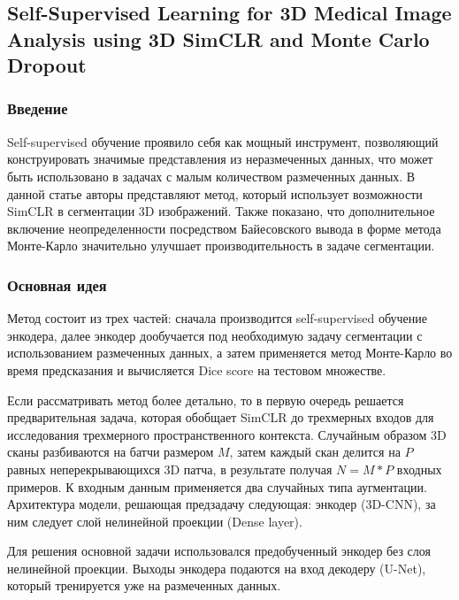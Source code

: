 \subsection*{Self-Supervised Learning for 3D Medical Image Analysis using
3D SimCLR and Monte Carlo Dropout}

\subsubsection*{Введение} 
Self-supervised обучение проявило себя как мощный инструмент,
позволяющий конструировать значимые представления из неразмеченных
данных, что может быть использовано в задачах с малым количеством 
размеченных данных. В данной статье \cite{ann14} авторы представляют метод, 
который использует возможности SimCLR в сегментации 3D изображений.
Также показано, что дополнительное включение неопределенности 
посредством Байесовского вывода в форме метода Монте-Карло
значительно улучшает производительность в задаче сегментации.

\subsubsection*{Основная идея}
Метод состоит из трех частей: сначала производится self-supervised 
обучение энкодера, далее энкодер дообучается под необходимую 
задачу сегментации с использованием размеченных данных, а затем 
применяется метод Монте-Карло во время предсказания и вычисляется 
Dice score на тестовом множестве. \par
Если рассматривать метод более детально, то в первую очередь 
решается предварительная задача, которая обобщает SimCLR до 
трехмерных входов для исследования трехмерного пространственного контекста.
Случайным образом 3D сканы разбиваются на батчи размером \(M\), затем каждый скан 
делится на \(P\) равных неперекрывающихся 3D патча, в результате получая \(N=M*P\)
входных примеров. К входным данным применяется два случайных типа аугментации.
Архитектура модели, решающая предзадачу следующая: энкодер (3D-CNN), за ним следует 
слой нелинейной проекции (Dense layer). \par
Для решения основной задачи использовался предобученный энкодер без слоя нелинейной 
проекции. Выходы энкодера подаются на вход декодеру (U-Net), который тренируется 
уже на размеченных данных.
